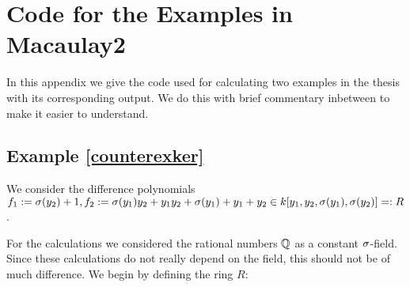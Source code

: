 



\section{Code for the Examples in Macaulay2}

In this appendix we give the code used for calculating two examples in the thesis with its corresponding output. We do this with brief commentary inbetween to make it easier to understand.

\subsection{Example \ref{counterexker}}
We consider the difference polynomials $f_1 := \sigma(y_2) + 1, f_2:= \sigma(y_1)y_2 + y_1y_2 + \sigma(y_1) + y_1 + y_2 \in k[y_1,y_2,\sigma(y_1),\sigma(y_2)] =: R$.

For the calculations we considered the rational numbers $\mathbb{Q}$ as a constant $\sigma$-field. Since these calculations do not really depend on the field, this should not be of much difference. We begin by defining the ring $R$:

